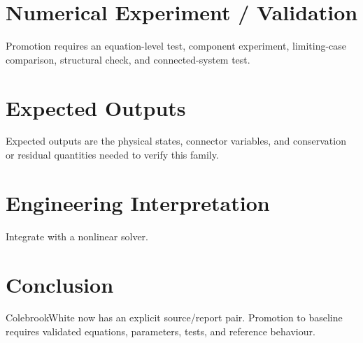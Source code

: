 \documentclass[10pt,a4paper]{article}
\begin{document}
\section{Numerical Experiment / Validation}Promotion requires an equation-level test, component experiment, limiting-case comparison, structural check, and connected-system test.
\section{Expected Outputs}Expected outputs are the physical states, connector variables, and conservation or residual quantities needed to verify this family.
\section{Engineering Interpretation}Integrate with a nonlinear solver.
\section*{Conclusion}ColebrookWhite now has an explicit source/report pair. Promotion to baseline requires validated equations, parameters, tests, and reference behaviour.
\end{document}
